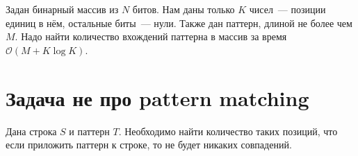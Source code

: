 \documentclass[addpoints]{exam}
\begin{document}
Задан бинарный массив из $N$ битов. Нам даны только $K$ чисел~--- позиции единиц в нём, остальные биты~--- нули. Также дан паттерн, длиной не более чем  $M$. Надо найти количество вхождений паттерна в массив за время $\mathcal{O}(M + K \log{K})$.

\section{Задача не про pattern matching}

Дана строка $S$ и паттерн $T$. Необходимо найти количество таких позиций, что если приложить паттерн к строке, то не будет никаких совпадений.
\end{document}
